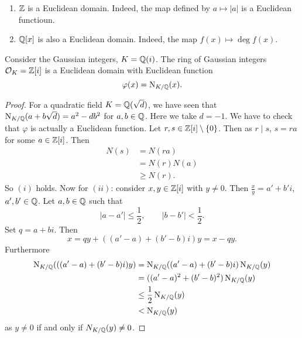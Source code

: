 \begin{examples}
	\begin{enumerate}
		\item $\mathbb{Z}$ is a Euclidean domain.
			Indeed, the map defined by $a \mapsto \left\lvert a \right\rvert$
			is a Euclidean functioun.

		\item $\mathbb{Q}[x]$ is also a Euclidean domain.
			Indeed, the map $f(x) \mapsto \deg{f(x)}$.
	\end{enumerate}
\end{examples}

\begin{lemma}[]
	Consider the Gaussian integers, $K = \mathbb{Q}(i)$.
	The ring of Gaussian integers $\mathcal O_K = \mathbb{Z}[i]$ is a
	Euclidean domain with Euclidean function
	\[
		\varphi(x) = \operatorname{N}_{K/\mathbb{Q}}(x).
	\]
\end{lemma}

\begin{proof}
	For a quadratic field $K = \mathbb{Q}(\sqrt d)$,
	we have seen that $\operatorname{N}_{K/\mathbb{Q}}(a + b\sqrt d) = a^2 - db^2$
	for $a,b \in \mathbb{Q}$.
	Here we take $d = -1$.
	We have to check that $\varphi$ is actually a Euclidean function.
	Let $r,s \in \mathbb{Z}[i] \setminus \left\{
		0
	\right\}$.
	Then as $r \mid s$, $s = ra$ for some $a \in \mathbb{Z}[i]$.
	Then
	\begin{align*}
		N(s)
		&= N(ra) \\
		&= N(r) N(a) \\
		&\geq N(r).
	\end{align*}
	So $(i)$ holds.
	Now for $(ii)$: consider $x, y \in \mathbb{Z}[i]$ with $y \neq 0$.
	Then $\frac xy = a' + b'i$, $a', b' \in \mathbb{Q}$.
	Let $a, b \in \mathbb{Q}$ such that
	\[
		\left\lvert a - a' \right\rvert \leq \frac12, \qquad
		\left\lvert b - b' \right\rvert < \frac12.
	\]
	Set $q = a + bi$.
	Then
	\[
		x = qy + ((a' - a) + (b' - b)i)y = x - qy.
	\]
	Furthermore
	\begin{align*}
		\operatorname{N}_{K/\mathbb{Q}}(((a'-a) + (b'-b)i)y)
		&= \operatorname{N}_{K/\mathbb{Q}}((a' - a) + (b' - b)i)
			\operatorname{N}_{K/\mathbb{Q}}(y) \\
		&= ((a'-a)^2 + (b'-b)^2)
			\operatorname{N}_{K/\mathbb{Q}}(y) \\
		&\leq \frac12 \operatorname{N}_{K/\mathbb{Q}}(y) \\
		&< \operatorname{N}_{K/\mathbb{Q}}(y)
	\end{align*}
	as $y \neq 0$ if and only if $N_{K/\mathbb{Q}}(y) \neq 0$.
\end{proof}
